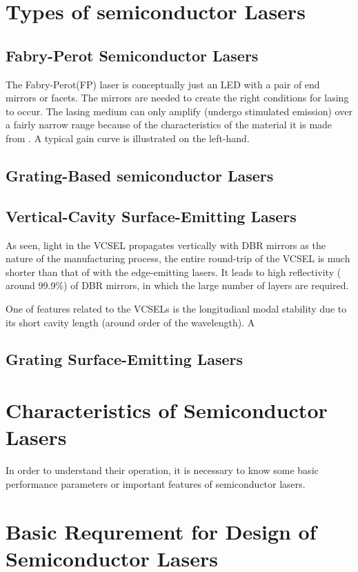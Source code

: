 \section{Types of semiconductor Lasers} \label{corrections}
\subsection{Fabry-Perot Semiconductor Lasers}

The Fabry-Perot(FP) laser is conceptually just an LED with a pair of end
mirrors or facets. The mirrors are needed to create the right conditions for
lasing to occur. The lasing medium can only amplify (undergo stimulated
emission) over a fairly narrow range because of the characteristics of the
material it is made from . A typical gain curve is illustrated on the
left-hand. 

\subsection{Grating-Based semiconductor Lasers}
\subsection{Vertical-Cavity Surface-Emitting Lasers}

As seen, light in the VCSEL propagates vertically with DBR mirrors as the
nature of the manufacturing process, the entire round-trip of the VCSEL is much
shorter than that of with the edge-emitting lasers. It leads to high
reflectivity ( around 99.9$\%$) of DBR mirrors, in which the large number of
layers are required.

One of features related to the VCSELs is the longitudianl modal stability due
to its short cavity length (around order of the wavelength). A

\subsection{Grating Surface-Emitting Lasers}
\section{Characteristics of Semiconductor Lasers} \label{corrections}

In order to understand their operation, it is necessary to know some basic
performance parameters or important features of semiconductor lasers.

\section{Basic Requrement for Design of Semiconductor Lasers} \label{corrections}
